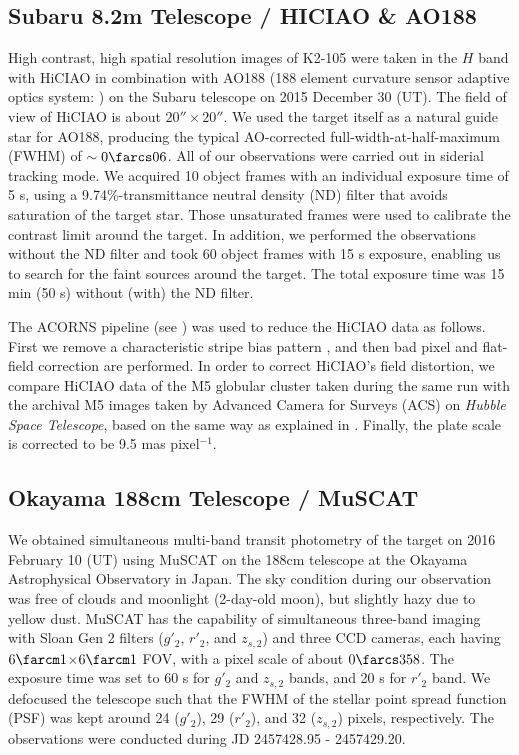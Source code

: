 \documentclass[]{pasj01}
\begin{document}
\subsection{Subaru 8.2m Telescope / HICIAO \& AO188}

High contrast, high spatial resolution images of K2-105 were taken
in the $H$ band with HiCIAO \citep{2006SPIE.6269E..28T}
in combination with AO188 (188 element curvature sensor adaptive optics system:
\cite{2008SPIE.7015E..25H}) on the Subaru telescope on 2015 December 30 (UT).
The field of view of HiCIAO is about $20'' \times 20''$.
We used the target itself as a natural guide star for AO188,
producing the typical AO-corrected full-width-at-half-maximum (FWHM) of $\sim0\farcs06$.
All of our observations were carried out in siderial tracking mode.
We acquired 10 object frames with an individual exposure time of 5 s,
using a 9.74\%-transmittance neutral density (ND) filter
that avoids saturation of the target star.
Those unsaturated frames were used to calibrate the contrast limit around the target.
In addition, we performed the observations without the ND filter
and took 60 object frames with 15 s exposure,
enabling us to search for the faint sources around the target.
The total exposure time was 15 min (50 s) without (with) the ND filter.

The ACORNS pipeline (see \cite{2013ApJ...764..183B})
was used to reduce the HiCIAO data as follows.
First we remove a characteristic stripe bias pattern \citep{2010SPIE.7735E..30S},
and then bad pixel and flat-field correction are performed.
In order to correct HiCIAO's field distortion,
we compare HiCIAO data of the M5 globular cluster taken during the same run
with the archival M5 images taken by Advanced Camera for Surveys (ACS)
on {\it Hubble Space Telescope}, based on the same way as explained in \cite{2013ApJ...764..183B}.
Finally, the plate scale is corrected to be 9.5 mas pixel$^{-1}$.

\subsection{Okayama 188cm Telescope / MuSCAT}

We obtained simultaneous multi-band transit photometry of the target 
on 2016 February 10 (UT) using
MuSCAT \citep{2015JATIS...1d5001N} on the 188cm telescope
at the Okayama Astrophysical Observatory in Japan.
The sky condition during our observation was free of clouds and moonlight (2-day-old moon),
but slightly hazy due to yellow dust.
MuSCAT has the capability of simultaneous three-band imaging with
Sloan Gen 2 filters ($g'_2$, $r'_2$, and $z_{s,2}$) and three CCD cameras,
each having $6\farcm1$$\times$$6\farcm1$ FOV, with a pixel scale of about $0\farcs358$.
The exposure time was set to 60 s for $g'_2$ and $z_{s,2}$ bands,
and 20 s for $r'_2$ band.
We defocused the telescope such that the FWHM
of the stellar point spread function (PSF) was kept around 24 ($g'_2$),
29 ($r'_2$), and 32 ($z_{s,2}$) pixels, respectively.
The observations were conducted during JD 2457428.95 - 2457429.20.
\end{document}
